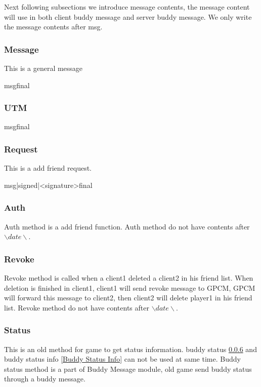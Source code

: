 \documentclass[oneside,titlepage,a4paper]{Definition/retrospy} %
\begin{document}
Next following subsections we introduce message contents,  the message content will use in both client buddy message and server buddy message. We only write the message contents after \tbs msg\tbs.
\subsubsection{Message}
This is a general message

\begin{mybox}
	\tbs msg\tbs<message content>\tbs final\tbs
\end{mybox}


\subsubsection{UTM}

\begin{mybox}
	\tbs msg\tbs<UTM message>\tbs final\tbs
\end{mybox}


\subsubsection{Request}
This is a add friend request.
\ServerResponse

\begin{mybox}
	\tbs msg\tbs|signed|<signature>\tbs final\tbs
\end{mybox}

\subsubsection{Auth}
Auth method is a add friend function.
Auth method do not have contents after $ \backslash date \backslash $.
\subsubsection{Revoke}
Revoke method is called when a client1 deleted a client2 in his friend list. When deletion is finished in client1, client1 will send revoke message to GPCM, GPCM will forward this message to client2, then client2 will delete player1 in his friend list.
Revoke method do not have contents after $ \backslash date \backslash $.
\subsubsection{Status}\label{Buddy Status}
This is an old method for game to get status information. buddy status \ref{Buddy Status} and buddy status info \ref{Buddy Status Info} can not be used at same time. Buddy status method is a part of Buddy Message module, old game send buddy status through a buddy message.
\ServerResponse
\end{document}
